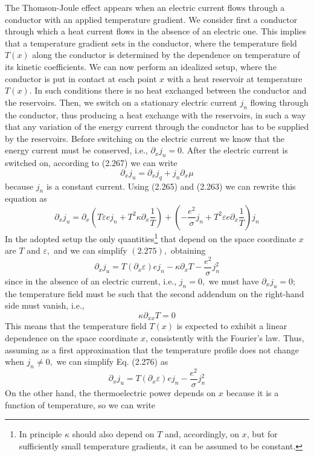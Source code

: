 \documentclass[\main/main.tex]{subfiles}
\begin{document}
The Thomson-Joule effect appears when an electric current flows through a conductor with an applied temperature gradient. We consider first a conductor through which a heat current flows in the absence of an electric one. This implies that a temperature gradient sets in the conductor, where the temperature field $T(x)$ along the conductor is determined by the dependence on temperature of its kinetic coefficients. We can now perform an idealized setup, where the conductor is put in contact at each point $x$ with a heat reservoir at temperature $T(x) .$ In such conditions there is no heat exchanged between the conductor and the reservoirs. Then, we switch on a stationary electric current $j_{n}$ flowing through the conductor, thus producing a heat exchange with the reservoirs, in such a way that any variation of the energy current through the conductor has to be supplied by the reservoirs. Before switching on the electric current we know that the energy current must be conserved, i.e., $\partial_{x} j_{u}=0 .$ After the electric current is switched on, according to (2.267) we can write
$$
\partial_{x} j_{u}=\partial_{x} j_{q}+j_{n} \partial_{x} \mu
$$
because $j_{n}$ is a constant current. Using (2.265) and (2.263) we can rewrite this equation as
$$
\partial_{x} j_{u}=\partial_{x}\left(T \varepsilon e j_{n}+T^{2} \kappa \partial_{x} \frac{1}{T}\right)+\left(-\frac{e^{2}}{\sigma} j_{n}+T^{2} \varepsilon e \partial_{x} \frac{1}{T}\right) j_{n}
$$
In the adopted setup the only quantities\footnote{In principle $\kappa$ should also depend on $T$ and, accordingly, on $x$, but for sufficiently small temperature gradients, it can be assumed to be constant.} that depend on the space coordinate $x$ are $T$ and $\varepsilon,$ and we can simplify $(2.275),$ obtaining
$$
\partial_{x} j_{u}=T\left(\partial_{x} \varepsilon\right) e j_{n}-\kappa \partial_{x} T-\frac{e^{2}}{\sigma} j_{n}^{2}
$$
since in the absence of an electric current, i.e., $j_{n}=0,$ we must have $\partial_{x} j_{u}=0 ;$ the temperature field must be such that the second addendum on the right-hand side must vanish, i.e.,
$$
\kappa \partial_{x x} T=0
$$
This means that the temperature field $T(x)$ is expected to exhibit a linear dependence on the space coordinate $x$, consistently with the Fourier's law. Thus, assuming as a first approximation that the temperature profile does not change when $j_{n} \neq 0,$ we can simplify Eq. (2.276) as
$$
\partial_{x} j_{u}=T\left(\partial_{x} \varepsilon\right) e j_{n}-\frac{e^{2}}{\sigma} j_{n}^{2}
$$
On the other hand, the thermoelectric power depends on $x$ because it is a function of temperature, so we can write
\end{document}
